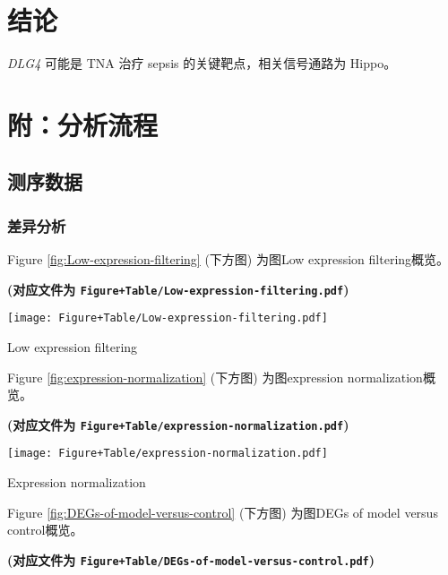 \documentclass[
]{article}
\begin{document}
\hypertarget{dis}{%
\section{结论}\label{dis}}

\emph{DLG4} 可能是 TNA 治疗 sepsis 的关键靶点，相关信号通路为 Hippo。

\hypertarget{ux9644ux5206ux6790ux6d41ux7a0b}{%
\section{附：分析流程}\label{ux9644ux5206ux6790ux6d41ux7a0b}}

\hypertarget{ux6d4bux5e8fux6570ux636e}{%
\subsection{测序数据}\label{ux6d4bux5e8fux6570ux636e}}

\hypertarget{ux5deeux5f02ux5206ux6790}{%
\subsubsection{差异分析}\label{ux5deeux5f02ux5206ux6790}}

Figure \ref{fig:Low-expression-filtering} (下方图) 为图Low expression filtering概览。

\textbf{(对应文件为 \texttt{Figure+Table/Low-expression-filtering.pdf})}

\def\@captype{figure}
\begin{center}
\texttt{[image: Figure+Table/Low-expression-filtering.pdf]}
\caption{Low expression filtering}\label{fig:Low-expression-filtering}
\end{center}

Figure \ref{fig:expression-normalization} (下方图) 为图expression normalization概览。

\textbf{(对应文件为 \texttt{Figure+Table/expression-normalization.pdf})}

\def\@captype{figure}
\begin{center}
\texttt{[image: Figure+Table/expression-normalization.pdf]}
\caption{Expression normalization}\label{fig:expression-normalization}
\end{center}

Figure \ref{fig:DEGs-of-model-versus-control} (下方图) 为图DEGs of model versus control概览。

\textbf{(对应文件为 \texttt{Figure+Table/DEGs-of-model-versus-control.pdf})}
\end{document}
